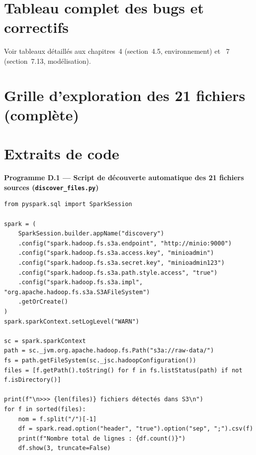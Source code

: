 \documentclass[11pt,a4paper]{report}
\begin{document}
\chapter{Tableau complet des bugs et correctifs}
\statutFait
Voir tableaux détaillés aux chapitres~4 (section~4.5, environnement) et
~7 (section~7.13, modélisation).

\chapter{Grille d'exploration des 21 fichiers (complète)}

\chapter{Extraits de code}
\statutFait
{\sffamily\bfseries\small\color{corpslate} Programme D.1 --- Script de découverte automatique des 21 fichiers sources (\texttt{discover\_files.py})}
\begin{Verbatim}[fontsize=\scriptsize, formatcom=\color{corpslate}, frame=single, rulecolor=\color{lightgrayline}, framesep=3mm, breaklines=true, breaksymbolleft={}, tabsize=2]
from pyspark.sql import SparkSession

spark = (
    SparkSession.builder.appName("discovery")
    .config("spark.hadoop.fs.s3a.endpoint", "http://minio:9000")
    .config("spark.hadoop.fs.s3a.access.key", "minioadmin")
    .config("spark.hadoop.fs.s3a.secret.key", "minioadmin123")
    .config("spark.hadoop.fs.s3a.path.style.access", "true")
    .config("spark.hadoop.fs.s3a.impl", "org.apache.hadoop.fs.s3a.S3AFileSystem")
    .getOrCreate()
)
spark.sparkContext.setLogLevel("WARN")

sc = spark.sparkContext
path = sc._jvm.org.apache.hadoop.fs.Path("s3a://raw-data/")
fs = path.getFileSystem(sc._jsc.hadoopConfiguration())
files = [f.getPath().toString() for f in fs.listStatus(path) if not f.isDirectory()]

print(f"\n>>> {len(files)} fichiers détectés dans S3\n")
for f in sorted(files):
    nom = f.split("/")[-1]
    df = spark.read.option("header", "true").option("sep", ";").csv(f)
    print(f"Nombre total de lignes : {df.count()}")
    df.show(3, truncate=False)
\end{Verbatim}
\end{document}
